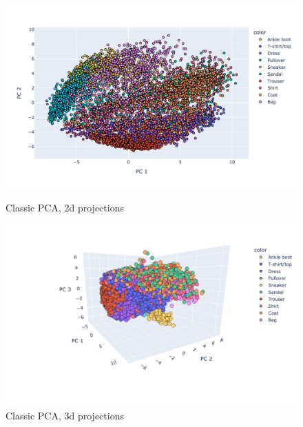 \begin{figure}[!htb]
    \begin{minipage}{0.5\textwidth}
      \centering
      \includegraphics[width=1\linewidth]{images/PCA_2PC.png}
      \caption{\footnotesize Classic PCA, 2d projections }\label{Fig:PCA_2PC}
    \end{minipage}\hfill
    \begin{minipage}{0.5\textwidth}
      \centering
      \includegraphics[width=1\linewidth]{images/PCA_3PC.png}
      \caption{\footnotesize Classic PCA, 3d projections}\label{Fig:PCA_3PC}
    \end{minipage}
 \end{figure}


